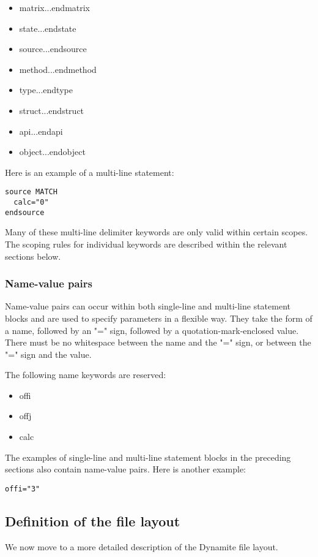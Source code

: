 \begin{itemize}
\item matrix...endmatrix
\item state...endstate
\item source...endsource
\item method...endmethod
\item type...endtype
\item struct...endstruct
\item api...endapi
\item object...endobject
\end{itemize}

Here is an example of a multi-line statement:

\begin{verbatim}
source MATCH
  calc="0"
endsource
\end{verbatim}

Many of these multi-line delimiter keywords are only valid within certain scopes.
The scoping rules for individual keywords are described within the
relevant sections below.

\subsubsection{Name-value pairs}
Name-value pairs can occur within both single-line and multi-line statement blocks
and are used to specify parameters in a flexible way.
They take the form of a name, followed by an "=" sign, followed by a quotation-mark-enclosed
value. There must be no whitespace between the name and the "=" sign, or between
the "=" sign and the value.

The following name keywords are reserved:

\begin{itemize}
\item offi
\item offj
\item calc
\end{itemize}

The examples of single-line and multi-line statement blocks in the
preceding sections also contain name-value pairs. Here is another
example:

\begin{verbatim}
offi="3"
\end{verbatim}

\subsection{Definition of the file layout}
We now move to a more detailed description of the Dynamite file layout.

